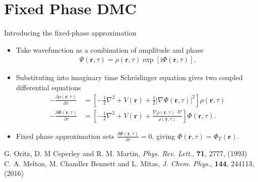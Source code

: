 \documentclass{beamer}
\newcommand{\II}{\mathrm{i}}
\begin{document}
\section{Fixed Phase DMC}
  \begin{frame}{Introducing the fixed-phase approximation}
    \begin{itemize}
     \item Take wavefunction as a combination of amplitude and phase
     \small{
      \begin{align}
\Psi \left(\mathbf{r} , \tau \right) = \rho \left( \mathbf{r} , \tau \right) \exp \left[ \II \Phi \left( \mathbf{r} , \tau \right) \right]. 
      \end{align}
      }
      \item Substituting into imaginary time Schr\"{o}dinger equation gives two coupled differential equations
      \small{
      \begin{align}
        \label{FPDMCr}
        - \frac{\partial \rho \left(\mathbf{r} , \tau \right)}{\partial \tau} &= \left[ -\frac{1}{2} \nabla^2 + V(\mathbf{r}) + \frac{1}{2} | \nabla \Phi \left(\mathbf{r} , \tau \right) |^2 \right] \rho \left(\mathbf{r} , \tau \right) \\
        \label{FPDMCi}
        - \frac{\partial \Phi \left(\mathbf{r} , \tau \right)}{\partial \tau} &= \left[ -\frac{1}{2} \nabla^2 + V(\mathbf{r})  + \frac{\nabla \rho \left(\mathbf{r} , \tau \right) \cdot \nabla }{\rho \left(\mathbf{r} , \tau \right)}  \right] \Phi \left(\mathbf{r} , \tau \right).
      \end{align}
      }
      \item Fixed phase approximation sets $\frac{\partial \Phi \left(\mathbf{r} , \tau \right)}{\partial \tau} = 0$, giving $\Phi(\mathbf{r},\tau) = \Phi_{T}(\mathbf{r})$.
    \end{itemize}
     \vspace{1em}
     \tiny{G. Oritz, D. M Ceperley and R. M. Martin, \textit{Phys. Rev. Lett.}, \textbf{71}, 2777, (1993)\\
     C. A. Melton, M. Chandler Bennett and L. Mitas, \textit{J. Chem. Phys.}, \textbf{144}, 244113, (2016)
 }%
  \end{frame}
  
\end{document}
